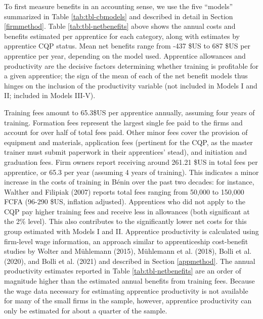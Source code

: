 \documentclass[
  11pt,
a4paper
]{article}
\begin{document}
To first measure benefits in an accounting sense, we use the five ``models'' summarized in Table \ref{tab:tbl-cbmodels} and described in detail in Section \ref{firmmethod}. Table \ref{tab:tbl-netbenefits} above shows the annual costs and benefits estimated per apprentice for each category, along with estimates by apprentice CQP status. Mean net benefits range from -437 \$US to 687 \$US per apprentice per year, depending on the model used. Apprentice allowances and productivity are the decisive factors determining whether training is profitable for a given apprentice; the sign of the mean of each of the net benefit models thus hinges on the inclusion of the productivity variable (not included in Models I and II; included in Models III-V).

Training fees amount to 65.3\$US per apprentice annually, assuming four years of training. Formation fees represent the largest single fee paid to the firms and account for over half of total fees paid. Other minor fees cover the provision of equipment and materials, application fees (pertinent for the CQP, as the master trainer must submit paperwork in their apprentices' stead), and initiation and graduation fees. Firm owners report receiving around 261.21 \$US in total fees per apprentice, or 65.3 per year (assuming 4 years of training). This indicates a minor increase in the costs of training in Bénin over the past two decades: for instance, Walther and Filipiak (2007) reports total fees ranging from 50,000 to 150,000 FCFA (96-290 \$US, inflation adjusted). Apprentices who did not apply to the CQP pay higher training fees and receive less in allowances (both significant at the 2\% level). This also contributes to the significantly lower net costs for this group estimated with Models I and II. Apprentice productivity is calculated using firm-level wage information, an approach similar to apprenticeship cost-benefit studies by Wolter and Mühlemann (2015), Mühlemann et al. (2018), Bolli et al. (2020), and Bolli et al. (2021) and described in Section \ref{appmethod}. The annual productivity estimates reported in Table \ref{tab:tbl-netbenefits} are an order of magnitude higher than the estimated annual benefits from training fees. Because the wage data necessary for estimating apprentice productivity is not available for many of the small firms in the sample, however, apprentice productivity can only be estimated for about a quarter of the sample.
\end{document}
